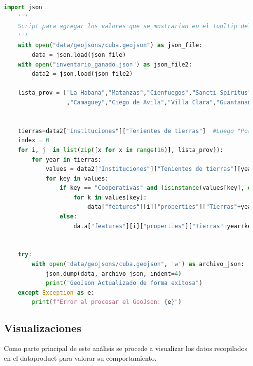 \documentclass{article}
\begin{document}
\begin{lstlisting}[language=Python, caption=Script para agregar valores al geojson]
    import json 
    '''
    Script para agregar los valores que se mostrarian en el tooltip del mapa al 'data/geojsons/cuba.geojson'
    '''
    with open("data/geojsons/cuba.geojson") as json_file:
        data = json.load(json_file)
    with open("inventario_ganado.json") as json_file2:
        data2 = json.load(json_file2)
    
    lista_prov = ["La Habana","Matanzas","Cienfuegos","Sancti Spiritus","Las Tunas","Holguin","Granma","Santiago de Cuba","Isla de la Juventud"
                  ,"Camaguey","Ciego de Avila","Villa Clara","Guantanamo","Pinar del Rio","Artemisa","Mayabeque"] #Provincias en el orden que aparece en la estructura del GeoJson
    
    
    tierras=data2["Instituciones"]["Tenientes de tierras"]  #Luego "Por Provincias"
    index = 0
    for i, j  in list(zip([x for x in range(16)], lista_prov)):
        for year in tierras:
            values = data2["Instituciones"]["Tenientes de tierras"][year][j]  #Luego "Por Provincias"
            for key in values:
                if key == "Cooperativas" and (isinstance(values[key], dict)):
                    for k in values[key]:
                        data["features"][i]["properties"]["Tierras"+year+k] = values[key][k]   #Luego "Entidades"
                else:
                    data["features"][i]["properties"]["Tierras"+year+key] = values[key]   #Luego "Entidades"
    
    
    try:
        with open("data/geojsons/cuba.geojson", 'w') as archivo_json:
            json.dump(data, archivo_json, indent=4)
            print("GeoJson Actualizado de forma exitosa")
    except Exception as e:
        print(f"Error al procesar el GeoJson: {e}")    
\end{lstlisting}

\newpage

\subsection{Visualizaciones}
Como parte principal de este análisis se procede a visualizar los datos recopilados en el dataproduct para valorar su comportamiento.
\end{document}
